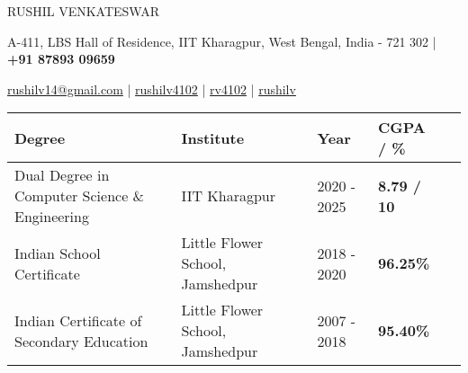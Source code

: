 \documentclass[10pt]{article}
\begin{document}
\begin{center}
    {\Huge RUSHIL VENKATESWAR}\\
\end{center}

\vspace{-2ex}

\begin{center}
    \small A-411, LBS Hall of Residence, IIT Kharagpur, West Bengal, India - 721 302 | 
    \faMobile\hspace{0.2ex} \textbf{+91 87893 09659}
\end{center}

\vspace{-2.5ex}

\begin{center}
    \Letter\hspace{0.2ex}\href{mailto:rushilv14@gmail.com}{\small rushilv14@gmail.com} | 
    \faLinkedinSquare\hspace{0.2ex} \href{https://www.linkedin.com/in/rushilv4102/}{\small rushilv4102} | 
    \faGithub\hspace{0.2ex} \href{https://github.com/rv4102/}{\small rv4102} |
    \faCode\hspace{0.2ex} \href{http://cse.iitkgp.ac.in/~rushilv/}{\small rushilv} 
\end{center}

\vspace{-2.5ex}
{\color{headliner} \spacedhrule{0.2ex}{2.0ex}}

\vspace{-1ex}
\renewcommand{\arraystretch}{1.5}
\begin{center}
    \indent \begin{tabular}{ |@{\hskip 0.115in}l @{\hskip 0.115in} |@{\hskip 0.115in}l @{\hskip 0.115in} |@{\hskip 0.115in}l @{\hskip 0.115in} |@{\hskip 0.115in}l @{\hskip 0.115in} |l }
    \hline \textbf{Degree} & \textbf{Institute} & \textbf{Year} & \textbf{CGPA / \%} \\ 
    \hline {Dual Degree} in Computer Science \& Engineering & IIT Kharagpur  & 2020 - 2025 &          \textbf{8.79 / 10}\\
    \hline Indian School Certificate & Little Flower School, Jamshedpur & 2018 - 2020 &  \textbf{96.25\%} \\
    \hline Indian Certificate of Secondary Education & Little Flower School, Jamshedpur & 2007 - 2018 &  \textbf{95.40\% } \\
    \hline
    \end{tabular}
\end{center}
\end{document}
